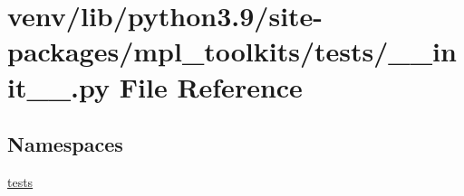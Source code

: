 \hypertarget{venv_2lib_2python3_89_2site-packages_2mpl__toolkits_2tests_2____init_____8py}{}\section{venv/lib/python3.9/site-\/packages/mpl\+\_\+toolkits/tests/\+\_\+\+\_\+init\+\_\+\+\_\+.py File Reference}
\label{venv_2lib_2python3_89_2site-packages_2mpl__toolkits_2tests_2____init_____8py}
\subsection*{Namespaces}
\begin{DoxyCompactItemize}
\item 
 \hyperlink{namespacetests}{tests}
\end{DoxyCompactItemize}
